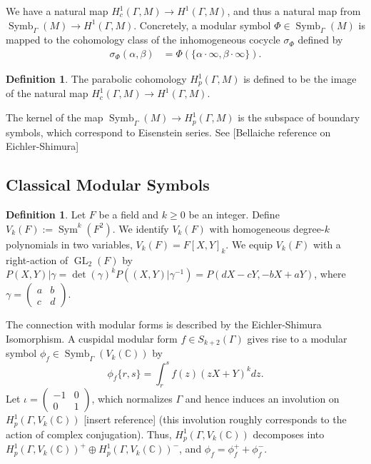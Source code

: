 \documentclass[10pt]{amsart}
\theoremstyle{plain}
\theoremstyle{definition}
\newtheorem{definition}[theorem]{Definition}
\newcommand{\CC}{{\mathbb{C}}}
\DeclareMathOperator{\GL}{GL}
\DeclareMathOperator{\Sym}{Sym}
\DeclareMathOperator{\Symb}{Symb}
\begin{document}
We have a natural map $H^1_c(\Gamma, M)\longrightarrow H^1(\Gamma,M)$, and thus a natural map from $\Symb_\Gamma(M)\longrightarrow H^1(\Gamma,M)$. Concretely, a modular symbol $\Phi\in \Symb_\Gamma(M)$ is mapped to the cohomology class of the inhomogeneous cocycle $\sigma_\Phi$ defined by
\begin{align}
\sigma_{\Phi}(\alpha, \beta) &= \Phi(\{\alpha \cdot \infty, \beta \cdot \infty\}).%
\end{align}
\begin{definition}
The parabolic cohomology $H^1_p(\Gamma,M)$ is defined to be the image of the natural map $H^1_c(\Gamma,M)\longrightarrow H^1(\Gamma,M)$.
\end{definition}
The kernel of the map $\Symb_\Gamma(M)\longrightarrow H^1_p(\Gamma,M)$ is the subspace of boundary symbols, which correspond to Eisenstein series. See [Bellaiche reference on Eichler-Shimura]



\subsection{Classical Modular Symbols}
\begin{definition}
Let $F$ be a field and $k\geq 0$ be an integer. Define $V_k(F):=\Sym^k(F^2)$. We identify $V_k(F)$ with homogeneous degree-$k$ polynomials in two variables, $V_k(F) = F[X,Y]_k$. We equip $V_k(F)$ with a right-action of $\GL_2(F)$ by $P(X,Y)|\gamma =\det(\gamma)^{k}P((X,Y)|\gamma^{-1})=P(dX-cY,-bX+aY)$, where $\gamma=\begin{pmatrix} a & b \\ c & d\end{pmatrix}$. 
\end{definition}
The connection with modular forms is described by the Eichler-Shimura Isomorphism. A cuspidal modular form $f\in S_{k+2}(\Gamma)$ gives rise to a modular symbol $\phi_{f}\in \Symb_{\Gamma} (V_k(\CC))$ by
\begin{equation*}
	\phi_{f} \{r, s\} = \int_r^s f(z) (zX+Y)^k dz.
\end{equation*}
Let $\iota = \begin{pmatrix} -1 & 0 \\ 0 & 1\end{pmatrix}$, which normalizes $\Gamma$ and hence induces an involution on $H^1_p(\Gamma, V_k(\CC))$ [insert reference] (this involution roughly corresponds to the action of complex conjugation). Thus, $H^1_p(\Gamma, V_k(\CC))$ decomposes into $H^1_p(\Gamma,V_k(\CC))^+\oplus H^1_p(\Gamma,V_k(\CC))^-$, and $\phi_f = \phi_f^+ + \phi_f^-$. 
\end{document}
